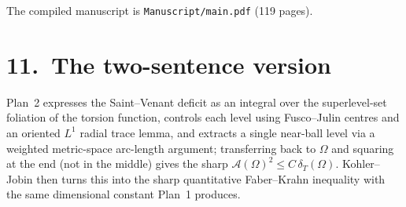 \documentclass[11pt,a4paper]{article}
\newcommand{\Fr}{\mathcal{A}}
\newcommand{\deltaT}{\delta_T}
\begin{document}
The compiled manuscript is \texttt{Manuscript/main.pdf} (119 pages).

\section*{11.\ The two-sentence version}

Plan~2 expresses the Saint--Venant deficit as an integral over the superlevel-set foliation of the torsion function, controls each level using Fusco--Julin centres and an oriented $L^1$ radial trace lemma, and extracts a single near-ball level via a weighted metric-space arc-length argument; transferring back to $\Omega$ and squaring at the end (not in the middle) gives the sharp $\Fr(\Omega)^2 \le C\,\deltaT(\Omega)$. Kohler--Jobin then turns this into the sharp quantitative Faber--Krahn inequality with the same dimensional constant Plan~1 produces.
\end{document}
